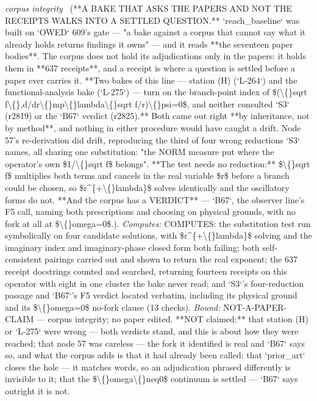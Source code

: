 \begin{description}
\textit{corpus integrity} \ (**A BAKE THAT ASKS THE PAPERS AND NOT THE RECEIPTS WALKS INTO A SETTLED QUESTION.** `reach\_baseline` was built on `OWED` 609's gate --- "a bake against a corpus that cannot say what it already holds returns findings it owns" --- and it reads **the seventeen paper bodies**. The corpus does not hold its adjudications only in the papers: it holds them in **637 receipts**, and a receipt is where a question is settled before a paper ever carries it. **Two bakes of this line --- station (H) (`L-264`) and the functional-analysis bake (`L-275`) --- turn on the branch-point index of \$(\textbackslash\{\}sqrt f\textbackslash\{\},d/dr\textbackslash\{\}mp\textbackslash\{\}lambda\textbackslash\{\}sqrt f/r)\textbackslash\{\}psi=0\$, and neither consulted `S3` (r2819) or the `B67` verdict (r2825).** Both came out right **by inheritance, not by method**, and nothing in either procedure would have caught a drift. Node 57's re-derivation did drift, reproducing the third of four wrong reductions `S3` names, all sharing one substitution: "the NORM measure put where the operator's own \$1/\textbackslash\{\}sqrt f\$ belongs". **The test needs no reduction:** \$\textbackslash\{\}sqrt f\$ multiplies both terms and cancels in the real variable \$r\$ before a branch could be chosen, so \$r\textasciicircum{}\{+\textbackslash\{\}lambda\}\$ solves identically and the oscillatory forms do not. **And the corpus has a VERDICT** --- `B67`, the observer line's F5 call, naming both prescriptions and choosing on physical grounds, with no fork at all at \$\textbackslash\{\}omega=0\$.). 
\emph{Computes:} COMPUTES: the substitution test run symbolically on four candidate solutions, with \$r\textasciicircum{}\{+\textbackslash\{\}lambda\}\$ solving and the imaginary index and imaginary-phase closed form both failing; both self-consistent pairings carried out and shown to return the real exponent; the 637 receipt docstrings counted and searched, returning fourteen receipts on this operator with eight in one cluster the bake never read; and `S3`'s four-reduction passage and `B67`'s F5 verdict located verbatim, including its physical ground and its \$\textbackslash\{\}omega=0\$ no-fork clause (13 checks).
 \emph{Bound:} NOT-A-PAPER-CLAIM --- corpus integrity; no paper edited. **NOT claimed:** that station (H) or `L-275` were wrong --- both verdicts stand, and this is about how they were reached; that node 57 was careless --- the fork it identified is real and `B67` says so, and what the corpus adds is that it had already been called; that `prior\_art` closes the hole --- it matches words, so an adjudication phrased differently is invisible to it; that the \$\textbackslash\{\}omega\textbackslash\{\}neq0\$ continuum is settled --- `B67` says outright it is not.

\end{description}
